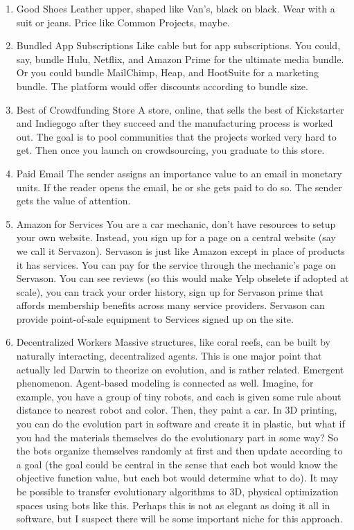 \documentclass[paper=a4, fontsize=11pt]{scrartcl} %
\numberwithin{equation}{section} %
\numberwithin{figure}{section} %
\numberwithin{table}{section} %
\begin{document}
\begin{enumerate}
\item{Good Shoes} Leather upper, shaped like Van's, black on black.  Wear with a suit or jeans.  Price like Common Projects, maybe.

\item{Bundled App Subscriptions} Like cable but for app subscriptions.  You could, say, bundle Hulu, Netflix, and Amazon Prime for the ultimate media bundle.  Or you could bundle MailChimp, Heap, and HootSuite for a marketing bundle.  The platform would offer discounts according to bundle size. 

\item{Best of Crowdfunding Store} A store, online, that sells the best of Kickstarter and Indiegogo after they succeed and the manufacturing process is worked out.  The goal is to pool communities that the projects worked very hard to get.  Then once you launch on crowdsourcing, you graduate to this store.

\item{Paid Email} The sender assigns an importance value to an email in monetary units.  If the reader opens the email, he or she gets paid to do so.  The sender gets the value of attention.  

\item{Amazon for Services} You are a car mechanic, don't have resources to setup your own website.  Instead, you sign up for a page on a central website (say we call it Servazon).  Servason is just like Amazon except in place of products it has services.  You can pay for the service through the mechanic's page on Servason.  You can see reviews (so this would make Yelp obselete if adopted at scale), you can track your order history, sign up for Servason prime that affords membership benefits across many service providers.  Servason can provide point-of-sale equipment to Services signed up on the site.

\item{Decentralized Workers} Massive structures, like coral reefs, can be built by naturally interacting, decentralized agents.  This is one major point that actually led Darwin to theorize on evolution, and is rather related.  Emergent phenomenon.  Agent-based modeling is connected as well.  Imagine, for example, you have a group of tiny robots, and each is given some rule about distance to nearest robot and color.  Then, they paint a car.  In 3D printing, you can do the evolution part in software and create it in plastic, but what if you had the materials themselves do the evolutionary part in some way?  So the bots organize themselves randomly at first and then update according to a goal (the goal could be central in the sense that each bot would know the objective function value, but each bot would determine what to do).  It may be possible to transfer evolutionary algorithms to 3D, physical optimization spaces using bots like this.  Perhaps this is not as elegant as doing it all in software, but I suspect there will be some important niche for this approach.


\end{enumerate}
\end{document}
